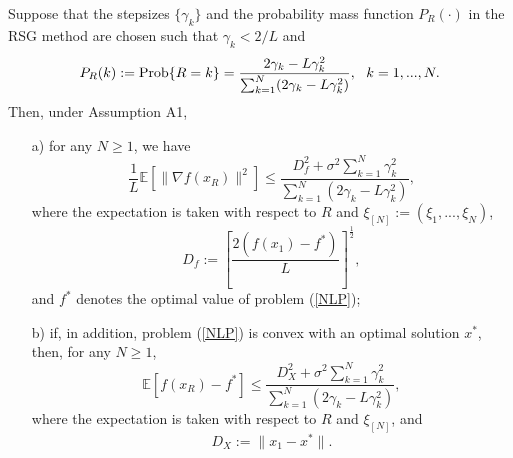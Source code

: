 \documentclass[final]{siamltex}
\newcommand{\beq}{\begin{equation}}
\newcommand{\eeq}{\end{equation}}
\def\eqnok#1{(\ref{#1})}
\def\prob{{\rm Prob}}
\newcommand{\bbe}{\mathbb{E}}
\def\prob{\mathop{\rm Prob}}
\begin{document}
\begin{theorem} \label{noncvx_smth_theorem}
Suppose that the stepsizes $\{\gamma_k\}$ and
the probability mass function $P_R(\cdot)$
in the RSG method are chosen such that $\gamma_k < 2/ L$ and
\beq \label{prob_fun}
P_R(k) := \prob\{R=k\} = \frac{2 \gamma_k- L\gamma_k^2}
{{\sum_{k=1}^N (2 \gamma_k- L \gamma_k^2)}}, \ \ k= 1,...,N.
\eeq
Then, under Assumption A1,
\begin{itemize}
\item [a)]for any $N \ge 1$, we have
\beq \label{noncvx_smth_converg}
\frac{1}{L} \bbe[\|\nabla f(x_R)\|^2]
\le \frac{D_f^2 + \sigma^2 {\sum_{k=1}^N \gamma_k^2}}{{\sum_{k=1}^N (2\gamma_k-L\gamma_k^2)}},
\eeq
where the expectation is taken with respect to $R$ and $\xi_{[N]} := (\xi_1,...,\xi_N)$,
\beq \label{def_Df}
D_f := \left[\frac{2\left(f(x_1) - f^*\right)}{L}\right]^\frac{1}{2},
\eeq
and $f^*$ denotes the optimal value of problem \eqnok{NLP};
\item [b)] if, in addition, problem \eqnok{NLP} is convex with an optimal solution $x^*$,
then, for any $N \ge 1$,
\beq \label{cvx_smth_converg}
\bbe[f(x_R) - f^*]
\le \frac{D_X^2
+ \sigma^2 {\sum_{k=1}^N \gamma_k^2}}{{\sum_{k=1}^N (2\gamma_k-L\gamma_k^2)}},
\eeq
where the expectation is taken with respect to $R$ and $\xi_{[N]}$,
and
\beq \label{def_Dx}
D_X := \|x_1-x^*\|.
\eeq
\end{itemize}
\end{theorem}
\end{document}
